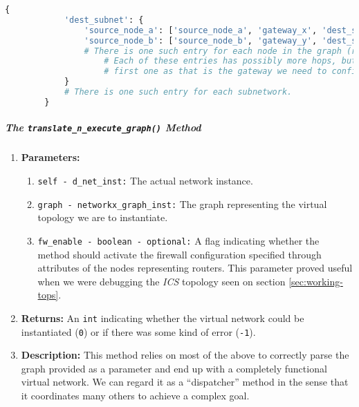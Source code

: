     \begin{lstlisting}[language = python, caption = Data structure containing all the netowrk's routes., label = last:route-dict]
        {
            'dest_subnet': {
                'source_node_a': ['source_node_a', 'gateway_x', 'dest_subnet_bridge'],
                'source_node_b': ['source_node_b', 'gateway_y', 'dest_subnet_bridge'],
                # There is one such entry for each node in the graph (routers, bridges and hosts).
                    # Each of these entries has possibly more hops, but we are only interested in the
                    # first one as that is the gateway we need to configure.
            }
            # There is one such entry for each subnetwork.
        }
    \end{lstlisting}

    \subparagraph{The \texttt{translate\_n\_execute\_graph()} Method}
        \begin{enumerate}
            \item \textbf{Parameters:}
            \begin{enumerate}
                \item \texttt{self - d\_net\_inst:} The actual network instance.
                \item \texttt{graph - networkx\_graph\_inst:} The graph representing the virtual topology we are to instantiate.
                \item \texttt{fw\_enable - boolean - optional:} A flag indicating whether the method should activate the firewall configuration specified through attributes of the nodes representing routers. This parameter proved useful when we were debugging the \textit{ICS} topology seen on section \ref{sec:working-tops}.
            \end{enumerate}
            \item \textbf{Returns:} An \texttt{int} indicating whether the virtual network could be instantiated (\texttt{0}) or if there was some kind of error (\texttt{-1}).
            \item \textbf{Description:} This method relies on most of the above to correctly parse the graph provided as a parameter and end up with a completely functional virtual network. We can regard it as a ``dispatcher'' method in the sense that it coordinates many others to achieve a complex goal.
        \end{enumerate}

